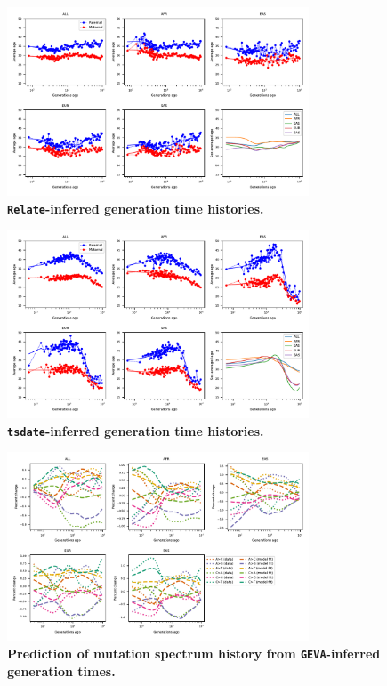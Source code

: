 \documentclass[]{article}
\newcommand{\GEVA}{\texttt{GEVA}\xspace}
\newcommand{\tsdate}{\texttt{tsdate}\xspace}
\newcommand{\relate}{\texttt{Relate}\xspace}
\begin{document}
\begin{figure}[ht!]
    \centering
    \includegraphics[width=0.8\textwidth]{../plots/inferred_generation_times.DM.relate.max_age.10000.pdf}
    \caption{
        \textbf{\relate-inferred generation time histories.}
    }
    \label{fig:relate-gen-times}
\end{figure}


\begin{figure}[ht!]
    \centering
    \includegraphics[width=0.8\textwidth]{../plots/inferred_generation_times.DM.tsdate.max_age.10000.pdf}
    \caption{
        \textbf{\tsdate-inferred generation time histories.}
    }
    \label{fig:tsdate-gen-times}
\end{figure}


\begin{figure}[ht!]
    \centering
    \includegraphics[width=0.8\textwidth]{../plots/goodness-of-fit.DM.geva.max_age.10000.pdf}
    \caption{
        \textbf{Prediction of mutation spectrum history from
        \GEVA-inferred generation times.}
    }
    \label{fig:geva-fit}
\end{figure}
\end{document}
